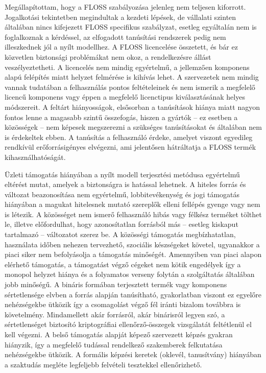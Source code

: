 \documentclass[12pt,magyar,a4paper,oneside]{scrreprt}
\begin{document}
Megállapítottam, hogy a FLOSS szabályozása jelenleg nem teljesen
kiforrott. Jogalkotási tekintetben megindultak a kezdeti lépések, de
vállalati szinten általában nincs kifejezett FLOSS specifikus
szabályzat, esetleg egyáltalán nem is foglalkoznak a kérdéssel, az
elfogadott tanúsítási rendszerek pedig nem illeszkednek jól a nyílt
modellhez. A FLOSS licencelése összetett, és bár ez közvetlen biztonsági
problémákat nem okoz, a rendelkezésre állást veszélyeztetheti. A
licencelés nem mindig egyértelmű, a jellemzően komponens alapú felépítés
miatt helyzet felmérése is kihívás lehet. A szervezetek nem mindig
vannak tudatában a felhasználás pontos feltételeinek és nem ismerik a
megfelelő licencű komponens vagy éppen a megfelelő licenctipus
kiválasztásának helyes módszereit. A feltárt hiányosságok, elsősorban a
tanúsítások hiánya miatt nagyon fontos lenne a magasabb szintű
összefogás, hiszen a gyártók -- ez esetben a közösségek -- nem képesek
megszerezni a szükséges tanúsításokat és általában nem is érdekeltek
ebben. A tanúsítás a felhasználó érdeke, amelyet viszont egyedileg
rendkívül erőforrásigényes elvégezni, ami jelentősen hátráltatja a FLOSS
termék kihasználhatóságát.

Üzleti támogatás hiányában a nyílt modell terjesztési metódusa
egyértelmű eltérést mutat, amelyek a biztonságra is hatással lehetnek. A
hiteles forrás és változat beazonosítása nem egyértelmű,
lobbitevékenység és jogi támogatás hiányában a magukat hitelesnek mutató
szereplők elleni fellépés gyenge vagy nem is létezik. A közösséget nem
ismerő felhasználó hibás vagy félkész terméket tölthet le, illetve
előfordulhat, hogy azonosítatlan forrásból más -- esetleg kiskaput
tartalmazó -- változatot szerez be. A közösségi támogatás
megbízhatatlan, használata időben nehezen tervezhető, szociális
készségeket követel, ugyanakkor a piaci siker nem befolyásolja a
támogatás minőségét. Amennyiben van piaci alapon elérhető támogatás, a
támogatást végző cégeket nem kötik engedélyek így a monopol helyzet
hiánya és a folyamatos verseny folytán a szolgáltatás általában jobb
minőségű. A bináris formában terjesztett termék vagy komponens
sértetlensége elvben a forrás alapján tanúsítható, gyakorlatban viszont
ez egyelőre nehézségekbe ütközik így a csomagolást végző fél iránti
bizalom továbbra is követelmény. Mindamellett akár forrásról, akár
binárisról legyen szó, a sértetlenséget biztosító kriptográfiai
ellenőrző-összegek vizsgálatát feltétlenül el kell végezni. A belső
támogatás alapját képező szervezett képzés gyakran hiányzik, így a
megfelelő tudással rendelkező szakemberek felkutatása nehézségekbe
ütközik. A formális képzési keretek (oklevél, tanusítvány) hiányában a
szaktudás megléte legfeljebb felvételi tesztekkel ellenőrizhető.
\end{document}

